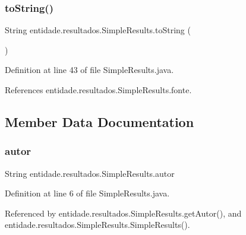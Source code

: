 \hypertarget{classentidade_1_1resultados_1_1SimpleResults_aed676e978f66a5e2fc11332124c9f91f}{}\label{classentidade_1_1resultados_1_1SimpleResults_aed676e978f66a5e2fc11332124c9f91f} 
\subsubsection{\texorpdfstring{to\+String()}{toString()}}
{\footnotesize\ttfamily String entidade.\+resultados.\+Simple\+Results.\+to\+String (\begin{DoxyParamCaption}{ }\end{DoxyParamCaption})}



Definition at line 43 of file Simple\+Results.\+java.



References entidade.\+resultados.\+Simple\+Results.\+fonte.



\subsection{Member Data Documentation}
\hypertarget{classentidade_1_1resultados_1_1SimpleResults_afc17e94212f3953a05f63f9de5d4c345}{}\label{classentidade_1_1resultados_1_1SimpleResults_afc17e94212f3953a05f63f9de5d4c345} 
\subsubsection{\texorpdfstring{autor}{autor}}
{\footnotesize\ttfamily String entidade.\+resultados.\+Simple\+Results.\+autor\hspace{0.3cm}{\ttfamily [private]}}



Definition at line 6 of file Simple\+Results.\+java.



Referenced by entidade.\+resultados.\+Simple\+Results.\+get\+Autor(), and entidade.\+resultados.\+Simple\+Results.\+Simple\+Results().

\hypertarget{classentidade_1_1resultados_1_1SimpleResults_a2442d65af6ba817cd26d5bd41ef8c65c}{}\label{classentidade_1_1resultados_1_1SimpleResults_a2442d65af6ba817cd26d5bd41ef8c65c} 
